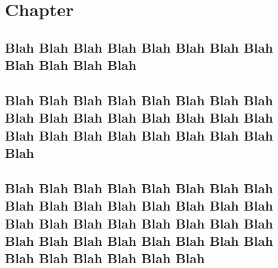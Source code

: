 \documentclass[baselinegrid,showframe,nocopyright]{uit-thesis-test}
\begin{document}
\frontmatter

\begin{abstract}
\lipsum
\end{abstract}

\begin{acknowledgement}
\lipsum
\end{acknowledgement}

\tableofcontents

\frontmatter
\layout

\mainmatter

\chapter{Chapter}
\lipsum[1-2]

\section{Blah Blah Blah Blah Blah Blah Blah Blah Blah Blah Blah Blah}
\lipsum[10-18]

\section{Blah Blah Blah Blah Blah Blah Blah Blah Blah Blah Blah Blah Blah Blah Blah Blah Blah Blah Blah Blah Blah Blah Blah Blah Blah}
\lipsum[10-18]

\section{Blah Blah Blah Blah Blah Blah Blah Blah Blah Blah Blah Blah Blah Blah Blah Blah Blah Blah Blah Blah Blah Blah Blah Blah Blah Blah Blah Blah Blah Blah Blah Blah Blah Blah Blah Blah Blah Blah}
\lipsum[10-17]
\end{document}

